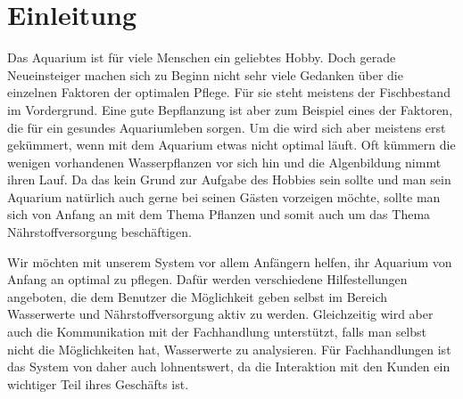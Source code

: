 \chapter{Einleitung}

Das Aquarium ist für viele Menschen ein geliebtes Hobby. Doch gerade Neueinsteiger machen sich zu Beginn nicht sehr viele Gedanken über die einzelnen Faktoren der optimalen Pflege. Für sie steht meistens der Fischbestand im Vordergrund. Eine gute Bepflanzung ist aber zum Beispiel eines der Faktoren, die für ein gesundes Aquariumleben sorgen. Um die wird sich aber meistens erst gekümmert, wenn mit dem Aquarium etwas nicht optimal läuft. Oft kümmern die wenigen vorhandenen Wasserpflanzen vor sich hin und die Algenbildung nimmt ihren Lauf. Da das kein Grund zur Aufgabe des Hobbies sein sollte und man sein Aquarium natürlich auch gerne bei seinen Gästen vorzeigen möchte, sollte man sich von Anfang an mit dem Thema Pflanzen und somit auch um das Thema Nährstoffversorgung beschäftigen.

Wir möchten mit unserem System vor allem Anfängern helfen, ihr Aquarium von Anfang an optimal zu pflegen. Dafür werden verschiedene Hilfestellungen angeboten, die dem Benutzer die Möglichkeit geben selbst im Bereich Wasserwerte und Nährstoffversorgung aktiv zu werden. Gleichzeitig wird aber auch die Kommunikation mit der Fachhandlung unterstützt, falls man selbst nicht die Möglichkeiten hat, Wasserwerte zu analysieren. Für Fachhandlungen ist das System von daher auch lohnentswert, da die Interaktion mit den Kunden ein wichtiger Teil ihres Geschäfts ist.